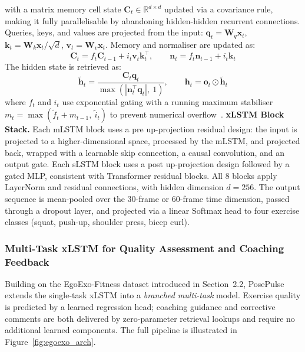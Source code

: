 \documentclass[conference,onecolumn,oneside]{IEEEtran}
\begin{document}
with a matrix memory cell state $\mathbf{C}_t \in \mathbb{R}^{d \times
d}$ updated via a covariance rule, making it fully parallelisable by
abandoning hidden-hidden recurrent connections. Queries, keys, and
values are projected from the input: $\mathbf{q}_t = \mathbf{W}_q
\mathbf{x}_t$, $\mathbf{k}_t = \mathbf{W}_k \mathbf{x}_t / \sqrt{d}$,
$\mathbf{v}_t = \mathbf{W}_v \mathbf{x}_t$. Memory and normaliser are
updated as:
\begin{equation}
\mathbf{C}_t = f_t \mathbf{C}_{t-1} + i_t \mathbf{v}_t \mathbf{k}_t^\top,
\qquad
\mathbf{n}_t = f_t \mathbf{n}_{t-1} + i_t \mathbf{k}_t
\end{equation}
The hidden state is retrieved as:
\begin{equation}
\tilde{\mathbf{h}}_t = \frac{\mathbf{C}_t \mathbf{q}_t}
{\max(|\mathbf{n}_t^\top \mathbf{q}_t|,\ 1)}, \qquad
\mathbf{h}_t = \mathbf{o}_t \odot \tilde{\mathbf{h}}_t
\end{equation}
where $f_t$ and $i_t$ use exponential gating with a running maximum
stabiliser $m_t = \max(\tilde{f}_t + m_{t-1},\ \tilde{i}_t)$ to
prevent numerical overflow~\cite{4}.
\textbf{xLSTM Block Stack.} Each mLSTM block uses a pre up-projection
residual design: the input is projected to a higher-dimensional space,
processed by the mLSTM, and projected back, wrapped with a learnable
skip connection, a causal convolution, and an output gate. Each sLSTM
block uses a post up-projection design followed by a gated MLP,
consistent with Transformer residual blocks. All 8 blocks apply
LayerNorm and residual connections, with hidden dimension $d = 256$.
The output sequence is mean-pooled over the 30-frame or 60-frame time dimension,
passed through a dropout layer, and projected via a linear Softmax
head to four exercise classes (squat, push-up, shoulder press, bicep
curl).

\vspace{0.4cm}
\subsubsection{Multi-Task xLSTM for Quality Assessment and Coaching Feedback}
\vspace{0.3cm}
Building on the EgoExo-Fitness dataset introduced in Section~2.2,
PosePulse extends the single-task xLSTM into a \emph{branched
multi-task} model. Exercise quality is predicted by a learned
regression head; coaching guidance and corrective comments are both
delivered by zero-parameter retrieval lookups and require no
additional learned components. The full pipeline is illustrated in
Figure~\ref{fig:egoexo_arch}.
\end{document}

